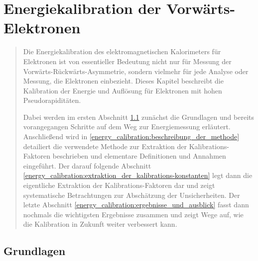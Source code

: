 


%
\chapter{Energiekalibration der Vorwärts-Elektronen}
\label{energy_calibration}

\begin{quote}
    Die Energiekalibration des elektromagnetischen Kalorimeters für Elektronen 
    ist von essentieller Bedeutung nicht nur für Messung der
    Vorwärts-Rückwärts-Asymmetrie, sondern vielmehr für jede Analyse oder
    Messung, die Elektronen einbezieht. Dieses Kapitel beschreibt die
    Kalibration der Energie und Auflösung für Elektronen mit hohen
    Pseudorapiditäten.

    Dabei werden im ersten Abschnitt \ref{energy_calibration:grundlagen}
    zunächst die Grundlagen und bereits vorangegangen Schritte auf dem Weg zur
    Energiemessung erläutert. Anschließend wird in
    \ref{energy_calibration:beschreibung_der_methode} detailiert die verwendete
    Methode zur Extraktion der Kalibrations-Faktoren beschrieben und elementare
    Definitionen und Annahmen eingeführt. Der darauf folgende Abschnitt
    \ref{energy_calibration:extraktion_der_kalibrations-konstanten} legt dann
    die eigentliche Extraktion der Kalibrations-Faktoren dar und zeigt
    systematische Betrachtungen zur Abschätzung der Unsicherheiten. Der letzte
    Abschnitt \ref{energy_calibration:ergebnisse_und_ausblick} fasst dann
    nochmals die wichtigsten Ergebnisse zusammen und zeigt Wege auf, wie die
    Kalibration in Zukunft weiter verbessert kann.
\end{quote}



%
\section{Grundlagen}
\label{energy_calibration:grundlagen}

